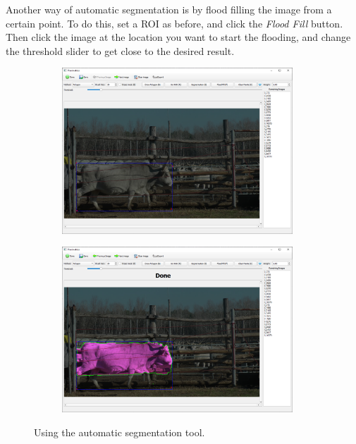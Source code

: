 \documentclass[10pt,a4paper,oneside]{report}             %
\begin{document}
Another way of automatic segmentation is by flood filling the image from a certain point. To do this, set a ROI as before, and click the \textit{Flood Fill} button. Then click the image at the location you want to start the flooding, and change the threshold slider to get close to the desired result.

\begin{figure}[H]
	\centering
	\begin{subfigure}{\textwidth}
		\centering 
		\includegraphics[width=0.95\textwidth]{./images/PlaniROI.png}
	\end{subfigure}
	\begin{subfigure}{\textwidth}
		\centering 
		\includegraphics[width=0.95\textwidth]{./images/PlaniSeg.png}
	\end{subfigure}
	\caption[]
	{\small  Using the automatic segmentation tool.}
\end{figure} 
\end{document}
